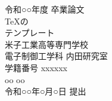 

\begin{titlepage}
	\begin{center}
		\vspace*{30truept}
		{\Large 令和○○年度 卒業論文} \\
		\vspace{100truept}
		{\LARGE TeXの}\\
		\vspace{12truept}
		{\LARGE テンプレート} \\
		\vspace{80truept}
		{\large
		米子工業高等専門学校\\
		電子制御工学科 内田研究室\\
		}
		\vspace{50truept}
		{\large 学籍番号 xxxxxx}\\ %
	
		\vspace{10truept}
		{\large  oo oo}\\ %
	
		\vspace{50truept}
		{\large 令和○○年○月○日 提出}\\ %
	\end{center}
\end{titlepage}


